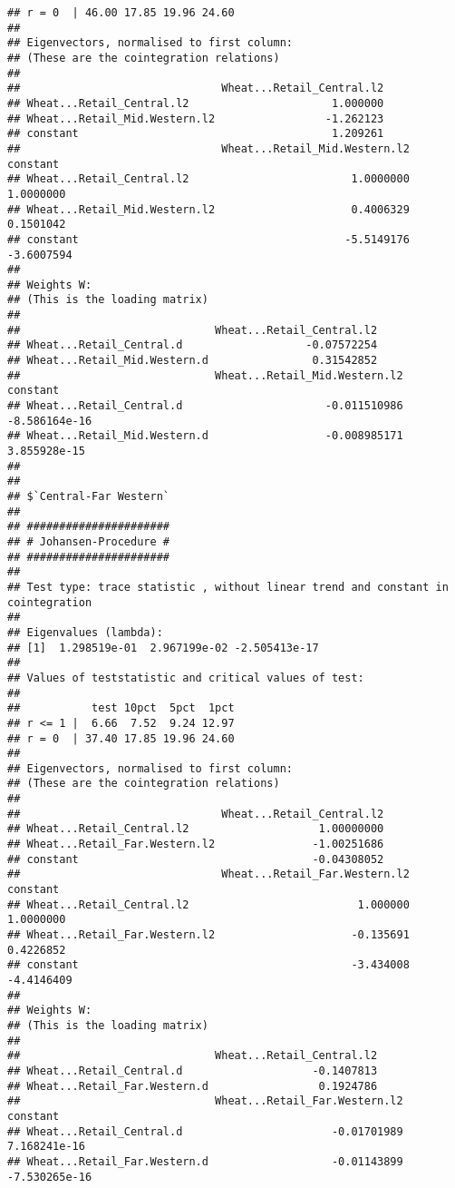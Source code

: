 \documentclass[12pt,]{article}
\begin{document}
\begin{verbatim}
## r = 0  | 46.00 17.85 19.96 24.60
## 
## Eigenvectors, normalised to first column:
## (These are the cointegration relations)
## 
##                               Wheat...Retail_Central.l2
## Wheat...Retail_Central.l2                      1.000000
## Wheat...Retail_Mid.Western.l2                 -1.262123
## constant                                       1.209261
##                               Wheat...Retail_Mid.Western.l2   constant
## Wheat...Retail_Central.l2                         1.0000000  1.0000000
## Wheat...Retail_Mid.Western.l2                     0.4006329  0.1501042
## constant                                         -5.5149176 -3.6007594
## 
## Weights W:
## (This is the loading matrix)
## 
##                              Wheat...Retail_Central.l2
## Wheat...Retail_Central.d                   -0.07572254
## Wheat...Retail_Mid.Western.d                0.31542852
##                              Wheat...Retail_Mid.Western.l2      constant
## Wheat...Retail_Central.d                      -0.011510986 -8.586164e-16
## Wheat...Retail_Mid.Western.d                  -0.008985171  3.855928e-15
## 
## 
## $`Central-Far Western`
## 
## ###################### 
## # Johansen-Procedure # 
## ###################### 
## 
## Test type: trace statistic , without linear trend and constant in cointegration 
## 
## Eigenvalues (lambda):
## [1]  1.298519e-01  2.967199e-02 -2.505413e-17
## 
## Values of teststatistic and critical values of test:
## 
##           test 10pct  5pct  1pct
## r <= 1 |  6.66  7.52  9.24 12.97
## r = 0  | 37.40 17.85 19.96 24.60
## 
## Eigenvectors, normalised to first column:
## (These are the cointegration relations)
## 
##                               Wheat...Retail_Central.l2
## Wheat...Retail_Central.l2                    1.00000000
## Wheat...Retail_Far.Western.l2               -1.00251686
## constant                                    -0.04308052
##                               Wheat...Retail_Far.Western.l2   constant
## Wheat...Retail_Central.l2                          1.000000  1.0000000
## Wheat...Retail_Far.Western.l2                     -0.135691  0.4226852
## constant                                          -3.434008 -4.4146409
## 
## Weights W:
## (This is the loading matrix)
## 
##                              Wheat...Retail_Central.l2
## Wheat...Retail_Central.d                    -0.1407813
## Wheat...Retail_Far.Western.d                 0.1924786
##                              Wheat...Retail_Far.Western.l2      constant
## Wheat...Retail_Central.d                       -0.01701989  7.168241e-16
## Wheat...Retail_Far.Western.d                   -0.01143899 -7.530265e-16

\end{verbatim}
\end{document}
